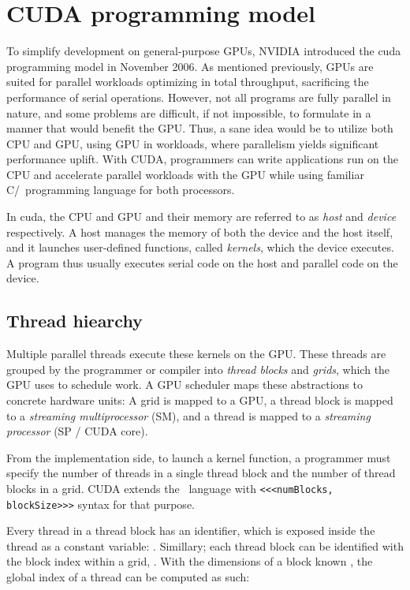 \section{CUDA programming model} \label{label:cuda}

To simplify development on general-purpose GPUs, NVIDIA introduced the \acrfull{cuda} programming model in November 2006. As mentioned previously, GPUs are suited for parallel workloads optimizing in total throughput, sacrificing the performance of serial operations. However, not all programs are fully parallel in nature, and some problems are difficult, if not impossible, to formulate in a manner that would benefit the GPU. Thus, a sane idea would be to utilize both CPU and GPU, using GPU in workloads, where parallelism yields significant performance uplift. With CUDA, programmers can write applications run on the CPU and accelerate parallel workloads with the GPU while using familiar C/\CC\ programming language for both processors.

In \acrshort{cuda}, the CPU and GPU and their memory are referred to as \textit{host} and \textit{device} respectively. A host manages the memory of both the device and the host itself, and it launches user-defined functions, called \textit{kernels}, which the device executes. A program thus usually executes serial code on the host and parallel code on the device.

\subsection{Thread hiearchy}

Multiple parallel threads execute these kernels on the GPU. These threads are grouped by the programmer or compiler into \textit{thread blocks} and \textit{grids}, which the GPU uses to schedule work. A GPU scheduler maps these abstractions to concrete hardware units: A grid is mapped to a GPU, a thread block is mapped to a \textit{streaming multiprocessor} (SM), and a thread is mapped to a \textit{streaming processor} (SP / CUDA core).

From the implementation side, to launch a kernel function, a programmer must specify the number of threads in a single thread block and the number of thread blocks in a grid. CUDA extends the \CC\ language with \texttt{<<<numBlocks, blockSize>>>} syntax for that purpose.

Every thread in a thread block has an identifier, which is exposed inside the thread as a constant variable: . Simillary; each thread block can be identified with the block index within a grid, . With the dimensions of a block known , the global index of a thread can be computed as such:

